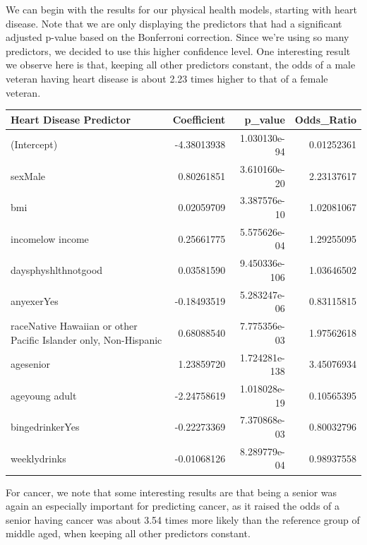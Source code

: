 \documentclass[
  10pt,
  letterpaper,
  DIV=11,
  numbers=noendperiod]{scrartcl}
\begin{document}
We can begin with the results for our physical health models, starting
with heart disease. Note that we are only displaying the predictors that
had a significant adjusted p-value based on the Bonferroni correction.
Since we're using so many predictors, we decided to use this higher
confidence level. One interesting result we observe here is that,
keeping all other predictors constant, the odds of a male veteran having
heart disease is about 2.23 times higher to that of a female veteran.

\begin{table}[h]
\centering
\renewcommand{\arraystretch}{0.8}
\begin{tabular}{l r r r}
\toprule
\textbf{Heart Disease Predictor} & Coefficient & p\_value & Odds\_Ratio \\
\midrule
(Intercept) & -4.38013938 & 1.030130e-94 & 0.01252361 \\
sexMale & 0.80261851 & 3.610160e-20 & 2.23137617 \\
bmi & 0.02059709 & 3.387576e-10 & 1.02081067 \\
incomelow income & 0.25661775 & 5.575626e-04 & 1.29255095 \\
daysphyshlthnotgood & 0.03581590 & 9.450336e-106 & 1.03646502 \\
anyexerYes & -0.18493519 & 5.283247e-06 & 0.83115815 \\
raceNative Hawaiian or other Pacific Islander only, Non-Hispanic & 0.68088540 & 7.775356e-03 & 1.97562618 \\
agesenior & 1.23859720 & 1.724281e-138 & 3.45076934 \\
ageyoung adult & -2.24758619 & 1.018028e-19 & 0.10565395 \\
bingedrinkerYes & -0.22273369 & 7.370868e-03 & 0.80032796 \\
weeklydrinks & -0.01068126 & 8.289779e-04 & 0.98937558 \\
\bottomrule
\end{tabular}
\end{table}

For cancer, we note that some interesting results are that being a
senior was again an especially important for predicting cancer, as it
raised the odds of a senior having cancer was about 3.54 times more
likely than the reference group of middle aged, when keeping all other
predictors constant.
\end{document}
